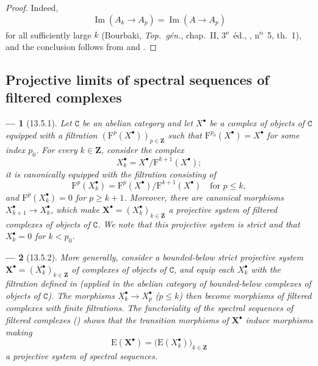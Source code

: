 \documentclass[oneside]{amsart}
\theoremstyle{ega-env-style}
\newtheorem*{env}{---}
\theoremstyle{ega-thm-env-style}
\theoremstyle{ega-defn-env-style}
\def\bb{\mathbf}                    %
\def\cat{\mathtt}                   %
\def\leq{\leqslant}                 %
\def\geq{\geqslant}                 %
\def\Im{\operatorname{Im}}
\let\EGAOriginalLabel\label
\renewcommand{\label}[1]{\phantomsection\EGAOriginalLabel{#1}}
\begin{document}
\begin{proof}
Indeed,
\[
  \Im(A_k\longrightarrow A_p)
  =
  \Im(A\longrightarrow A_p)
\]
for all sufficiently large $k$
(Bourbaki, \emph{Top.\ g\'{e}n.}, chap.~II,
3\textsuperscript{e}~\'{e}d., ,
n\textsuperscript{o}~5, th.~1), and the conclusion follows from
 and .
\end{proof}

\subsection{Projective limits of spectral sequences of filtered complexes}
\label{subsection:0.13.5}

\begin{env}[13.5.1]
\label{0.13.5.1}
Let $\cat{C}$ be an abelian category and let $X^\bullet$ be a complex
of objects of $\cat{C}$ equipped with a filtration
$(\mathrm{F}^p(X^\bullet))_{p\in\bb{Z}}$ such that
$\mathrm{F}^{p_0}(X^\bullet)=X^\bullet$ for some index $p_0$.
For every $k\in\bb{Z}$, consider the complex
\[
  X^\bullet_k=X^\bullet/\mathrm{F}^{k+1}(X^\bullet);
\]
it is canonically equipped with the filtration consisting of
\[
  \mathrm{F}^p(X^\bullet_k)
  =
  \mathrm{F}^p(X^\bullet)/\mathrm{F}^{k+1}(X^\bullet)
  \quad\text{for }p\leq k,
\]
and $\mathrm{F}^p(X^\bullet_k)=0$ for $p\geq k+1$.
Moreover, there are canonical morphisms
$X^\bullet_{k+1}\longrightarrow X^\bullet_k$, which make
$\bb{X}^\bullet=(X^\bullet_k)_{k\in\bb{Z}}$ a \emph{projective system
of filtered complexes of objects of $\cat{C}$}.
We note that this projective system is \emph{strict} and that
$X^\bullet_k=0$ for $k<p_0$.
\end{env}

\begin{env}[13.5.2]
\label{0.13.5.2}
More generally, consider a bounded-below strict projective system
$\bb{X}^\bullet=(X^\bullet_k)_{k\in\bb{Z}}$ of complexes of objects of
$\cat{C}$, and equip each $X^\bullet_k$ with the filtration defined in
 (applied in the abelian category of bounded-below
complexes of objects of $\cat{C}$).
The morphisms
$X^\bullet_k\longrightarrow X^\bullet_p$ ($p\leq k$) then become
morphisms of \emph{filtered} complexes with finite filtrations.
The functoriality of the spectral sequences of filtered complexes
() shows that the transition morphisms of
$\bb{X}^\bullet$ induce morphisms making
\[
  \mathrm{E}(\bb{X}^\bullet)
  =
  \bigl(\mathrm{E}(X^\bullet_k)\bigr)_{k\in\bb{Z}}
\]
a \emph{projective system of spectral sequences}.
\end{env}
\end{document}
